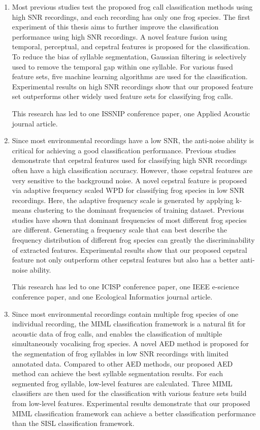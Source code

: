 \begin{enumerate}

\item Most previous studies test the proposed frog call classification methods using high SNR recordings, and each recording has only one frog species. The first experiment of this thesis aims to further improve the classification performance using high SNR recordings. A novel feature fusion using temporal, perceptual, and cepstral features is proposed for the classification. To reduce the bias of syllable segmentation, Gaussian filtering is selectively used to remove the temporal gap within one syllable. For various fused feature sets, five machine learning algorithms are used for the classification. Experimental results on high SNR recordings show that our proposed feature set outperforms other widely used feature sets for classifying frog calls. 

This research has led to one ISSNIP conference paper, one Applied Acoustic  journal article.

\item Since most environmental recordings have a low SNR, the anti-noise ability is critical for achieving a good classification performance. Previous studies demonstrate that cepstral features used for classifying high SNR recordings often have a high classification accuracy. However, those cepstral features are very sensitive to the background noise.
A novel cepstral feature is proposed via adaptive frequency scaled WPD for classifying frog species in low SNR recordings. Here, the adaptive frequency scale is generated by applying k-means clustering to the dominant frequencies of training dataset. Previous studies have shown that dominant frequencies of most different frog species are different. Generating a frequency scale that can best describe the frequency distribution of different frog species can greatly the discriminability of extracted features. Experimental results show that our proposed cepstral feature not only outperform other cepstral features but also has a better anti-noise ability.

This research has led to one ICISP conference paper, one IEEE e-science conference paper, and one Ecological Informatics journal article.

\item Since most environmental recordings contain multiple frog species of one individual recording, the MIML classification framework is a natural fit for acoustic data of frog calls, and enables the classification of multiple simultaneously vocalising frog species. A novel AED method is proposed for the segmentation of frog syllables in low SNR recordings with limited annotated data. Compared to other AED methods, our proposed AED method can achieve the best syllable segmentation results. For each segmented frog syllable, low-level features are calculated. Three MIML classifiers are then used for the classification with various feature sets build from low-level features.
Experimental results demonstrate that our proposed MIML classification framework can achieve a better classification performance than the SISL classification framework.


\end{enumerate}
